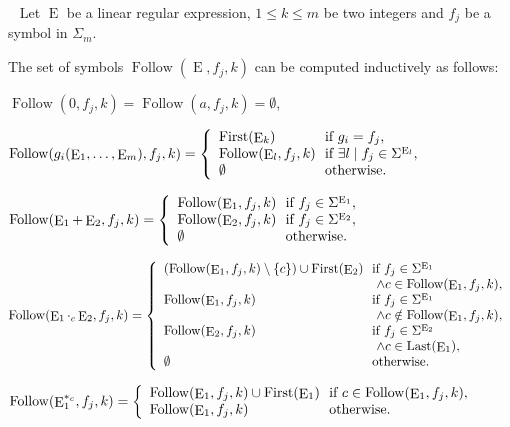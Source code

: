\documentclass{llncs}
\DeclareMathOperator{\Last}{Last}
\DeclareMathOperator{\First}{First}
\DeclareMathOperator{\Follow}{Follow}
\DeclareMathOperator{\E}{E}
\begin{document}
  \begin{lemma}\label{Computfollow}~\cite{arxiv}
   Let $\E$ be a linear regular expression, $1\leq k\leq m$ be two integers and $f_j$ be a symbol in $\Sigma_m$. 
  
    The set of symbols $\Follow(\E,f_j,k)$ can be computed inductively as follows:
    
    \centerline{$\Follow(0,f_j,k)=\Follow(a,f_j,k)=\emptyset$,}
    
    \centerline{
      $\Follow(g_i(\E_1,\ldots,\E_m),f_j,k)=
        \left\{
          \begin{array}{l@{\ }l}
            \First(\E_k) & \text{ if } g_i=f_j,\\
            \Follow(\E_l,f_j,k) & \text{ if } \exists l\mid f_j\in \Sigma^{\E_l},\\
            \emptyset & \text{ otherwise.} 
          \end{array}
        \right.$
    }
    
    \centerline{
      $\Follow(\E_1+\E_2,f_j,k)=
        \left\{
          \begin{array}{l@{\ }l}
            \Follow(\E_1,f_j,k) & \text{ if } f_j\in \Sigma^{\E_1},\\
            \Follow(\E_2,f_j,k) & \text{ if } f_j\in \Sigma^{\E_2},\\ 
             \emptyset & \text{ otherwise.} 
          \end{array}
        \right.$
    }
    
    \centerline{
      $\Follow(\E_1 \cdot_c \E_2,f_j,k)=
        \left\{
          \begin{array}{l@{\ }l}
            (\Follow(\E_1,f_j,k)\setminus\{c\}) \cup \First(\E_2) & \text{ if }  f_j\in \Sigma^{\E_1}\\
             &\ \  \wedge c\in\Follow(\E_1,f_j,k),\\
            \Follow(\E_1,f_j,k) & \text{ if } f_j\in \Sigma^{\E_1}\\
            &\ \  \wedge c\notin\Follow(\E_1,f_j,k),\\
            \Follow(\E_2,f_j,k) & \text{ if } f_j\in \Sigma^{\E_2}\\
            & \ \  \wedge c\in\Last(\E_1),\\
            \emptyset & \text{ otherwise.}
          \end{array}
        \right.$
    }
    
    \centerline{
      $\Follow(\E_1^{*_c},f_j,k)=
        \left\{
          \begin{array}{l@{\ }l}
            \Follow(\E_1,f_j,k) \cup \First(\E_1) & \text{ if } c\in\Follow(\E_1,f_j,k),\\
            \Follow(\E_1,f_j,k) & \text{ otherwise.}\\ 
          \end{array}
        \right.$
    }
  \end{lemma} 
\end{document}
